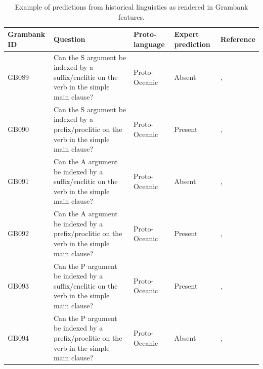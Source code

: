\documentclass[draft,10pt]{article} %
\begin{document}
\begin{table}[H] %
\centering
\caption{Example of predictions from historical linguistics as rendered in Grambank features.}
\label{example_HL_prediction_table}
\begin{tabular}{|l| p{3cm}|  p{3cm}| p{3cm} | p{3cm} |}
\hline
\textbf{Grambank ID} & \textbf{Question} & \textbf{Proto-language} & \textbf{Expert prediction}& \textbf{Reference} \\ \hline
GB089  &Can the S argument be indexed by a suffix/enclitic on the verb in the simple main clause? &Proto-Oceanic &Absent & \citet[498-499]{ross2004morphosyntactic}, \citet[83]{lynchrosscrowley_proto_grammar_oceanic} \\ \hline
GB090 &Can the S argument be indexed by a prefix/proclitic on the verb in the simple main clause? &Proto-Oceanic &Present &\citet[498-499]{ross2004morphosyntactic}, \citet[83]{lynchrosscrowley_proto_grammar_oceanic}  \\ \hline
GB091 &Can the A argument be indexed by a suffix/enclitic on the verb in the simple main clause? &Proto-Oceanic &Absent &\citet[498-499]{ross2004morphosyntactic}, \citet[83]{lynchrosscrowley_proto_grammar_oceanic} \\ \hline
GB092  &Can the A argument be indexed by a prefix/proclitic on the verb in the simple main clause? &Proto-Oceanic &Present &\citet[498-499]{ross2004morphosyntactic}, \citet[83]{lynchrosscrowley_proto_grammar_oceanic}  \\ \hline
GB093  &Can the P argument be indexed by a suffix/enclitic on the verb in the simple main clause? &Proto-Oceanic &Present &\citet[498-499]{ross2004morphosyntactic}, \citet[83]{lynchrosscrowley_proto_grammar_oceanic} \\ \hline
GB094  &Can the P argument be indexed by a prefix/proclitic on the verb in the simple main clause? &Proto-Oceanic &Absent & \citet[498-499]{ross2004morphosyntactic}, \citet[83]{lynchrosscrowley_proto_grammar_oceanic} \\ \hline
\end{tabular}
\end{table}
\end{document}

